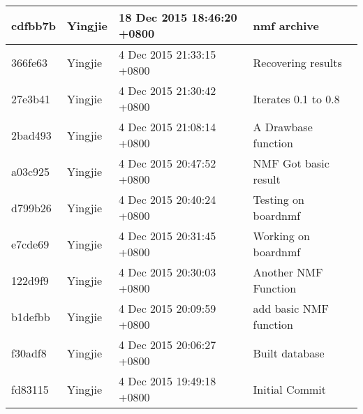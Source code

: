 \begin{longtable}{@{\extracolsep{\fill}}l|l|l|l@{}}
    cdfbb7b  & Yingjie &  18 Dec 2015 18:46:20 +0800 & nmf archive                                          \\ \hline
    366fe63  & Yingjie &  4 Dec 2015 21:33:15 +0800  & Recovering results                                   \\ \hline
    27e3b41  & Yingjie &  4 Dec 2015 21:30:42 +0800  & Iterates 0.1 to 0.8                                  \\ \hline
    2bad493  & Yingjie &  4 Dec 2015 21:08:14 +0800  & A Drawbase function                                  \\ \hline
    a03c925  & Yingjie &  4 Dec 2015 20:47:52 +0800  & NMF Got basic result                                 \\ \hline
    d799b26  & Yingjie &  4 Dec 2015 20:40:24 +0800  & Testing on boardnmf                                  \\ \hline
    e7cde69  & Yingjie &  4 Dec 2015 20:31:45 +0800  & Working on boardnmf                                  \\ \hline
    122d9f9  & Yingjie &  4 Dec 2015 20:30:03 +0800  & Another NMF Function                                 \\ \hline
    b1defbb  & Yingjie &  4 Dec 2015 20:09:59 +0800  & add basic NMF function                               \\ \hline
    f30adf8  & Yingjie &  4 Dec 2015 20:06:27 +0800  & Built database                                       \\ \hline
    fd83115  & Yingjie &  4 Dec 2015 19:49:18 +0800  & Initial Commit                                       \\ \hline
\end{longtable}
